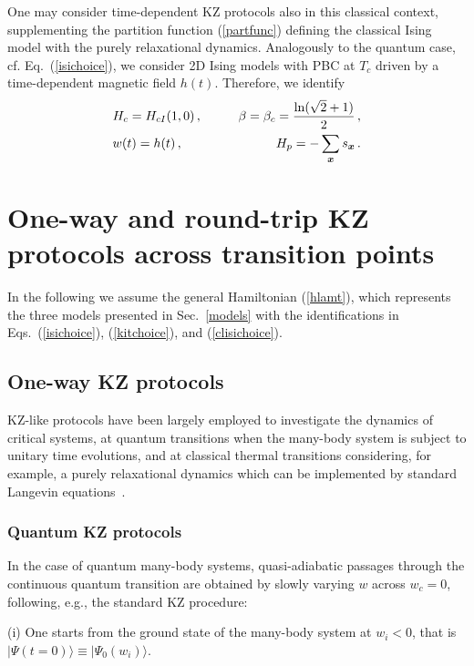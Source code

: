 One may consider time-dependent KZ protocols also in this classical
context, supplementing the partition function (\ref{partfunc})
defining the classical Ising model with the purely relaxational
dynamics.  Analogously to the quantum case, cf. Eq.~(\ref{isichoice}),
we consider 2D Ising models with PBC at $T_c$ driven by a
time-dependent magnetic field $h(t)$. Therefore, we identify
\begin{eqnarray}
  & H_c = H_{cI}(1,0)\,,\qquad &\beta=\beta_c = {\ln(\sqrt{2}+1)\over
    2} \,, \label{clisichoice}\\ & w(t) = h(t)\,, \qquad &H_p
  = - \sum_{\bm x} s_{\bm x}\,.\nonumber
\end{eqnarray}



\section{One-way and round-trip KZ protocols across transition points}
\label{protocols}


In the following we assume the general Hamiltonian (\ref{hlamt}),
which represents the three models presented in Sec.~\ref{models} with
the identifications in Eqs.~(\ref{isichoice}), (\ref{kitchoice}), and
(\ref{clisichoice}).


\subsection{One-way KZ protocols}
\label{oneway}


KZ-like protocols have been largely employed to investigate the
dynamics of critical systems, at quantum transitions when the
many-body system is subject to unitary time evolutions, and at
classical thermal transitions considering, for example, a purely
relaxational dynamics which can be implemented by standard Langevin
equations~\cite{HH-77}.

\subsubsection{Quantum KZ protocols}
\label{quoneway}

In the case of quantum many-body systems, quasi-adiabatic passages
through the continuous quantum transition are obtained by slowly
varying $w$ across $w_c = 0$, following, e.g., the standard KZ
procedure:

(i) One starts from the ground state of the many-body system at
  $w_i < 0$, that is $|\Psi(t=0)\rangle \equiv |\Psi_0(w_i)\rangle$.
  

